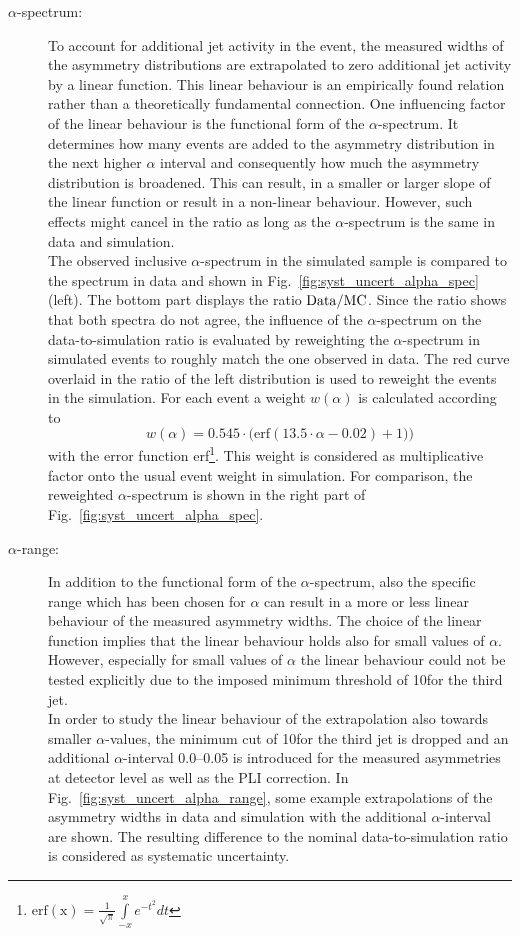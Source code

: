 \begin{description}
 \item[$\alpha$-spectrum:] To account for additional jet activity in the event, the measured widths of the asymmetry distributions are extrapolated to zero additional jet activity by a linear function. This linear behaviour is an empirically found relation rather than a theoretically fundamental connection. One influencing factor of the linear behaviour is the functional form of the $\alpha$-spectrum. It determines how many events are added to the asymmetry distribution in the next higher $\alpha$ interval and consequently how much the asymmetry distribution is broadened. This can result, \eg in a smaller or larger slope of the linear function or result in a non-linear behaviour. However, such effects might cancel in the ratio as long as the $\alpha$-spectrum is the same in data and simulation. \\
 The observed inclusive $\alpha$-spectrum in the simulated sample is compared to the spectrum in data and shown in Fig.~\ref{fig:syst_uncert_alpha_spec} (left). The bottom part displays the ratio $\rm{Data/MC}$. Since the ratio shows that both spectra do not agree, the influence of the $\alpha$-spectrum on the data-to-simulation ratio is evaluated by reweighting the $\alpha$-spectrum in simulated events to roughly match the one observed in data. The red curve overlaid in the ratio of the left distribution is used to reweight the events in the simulation. For each event a weight $w(\alpha)$ is calculated according to 
\begin{equation}
w(\alpha) = 0.545 \cdot \mathrm{(erf}(13.5 \cdot \alpha -0.02) +1))
\end{equation}
with the error function erf\footnote{ $\mathrm{erf(x)} = \frac{1}{\sqrt{\pi}} \int\limits_{-x}^{x} e^{-t^2} dt$}. This weight is considered as multiplicative factor onto the usual event weight in simulation. For comparison, the reweighted $\alpha$-spectrum is shown in the right part of Fig.~\ref{fig:syst_uncert_alpha_spec}.
 
 \item[$\alpha$-range:] In addition to the functional form of the $\alpha$-spectrum, also the specific range which has been chosen for $\alpha$ can result in a more or less linear behaviour of the measured asymmetry widths. The choice of the linear function implies that the linear behaviour holds also for small values of $\alpha$. However, especially for small values of $\alpha$ the linear behaviour could not be tested explicitly due to the imposed minimum \pt threshold of 10\gev for the third jet. \\
In order to study the linear behaviour of the extrapolation also towards smaller $\alpha$-values, the minimum \pt cut of 10\gev for the third jet is dropped and an additional $\alpha$-interval 0.0--0.05 is introduced for the measured asymmetries at detector level as well as the PLI correction. In Fig.~\ref{fig:syst_uncert_alpha_range}, some example extrapolations of the asymmetry widths in data and simulation with the additional $\alpha$-interval are shown. The resulting difference to the nominal data-to-simulation ratio is considered as systematic uncertainty.


\end{description}
